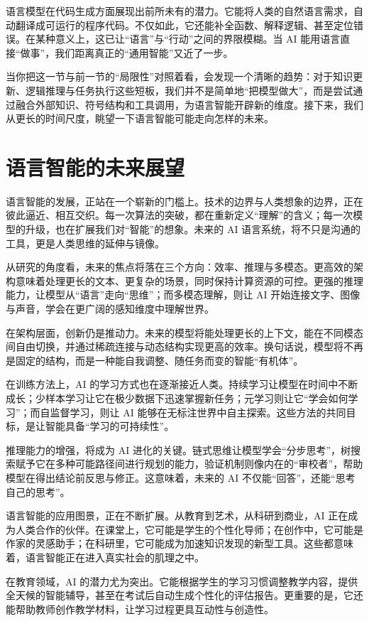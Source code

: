 语言模型在代码生成方面展现出前所未有的潜力。它能将人类的自然语言需求，自动翻译成可运行的程序代码。不仅如此，它还能补全函数、解释逻辑、甚至定位错误。在某种意义上，这已让“语言”与“行动”之间的界限模糊。当 AI 能用语言直接“做事”，我们距离真正的“通用智能”又近了一步。

当你把这一节与前一节的“局限性”对照着看，会发现一个清晰的趋势：对于知识更新、逻辑推理与任务执行这些短板，我们并不是简单地“把模型做大”，而是尝试通过融合外部知识、符号结构和工具调用，为语言智能开辟新的维度。接下来，我们从更长的时间尺度，眺望一下语言智能可能走向怎样的未来。

\section{语言智能的未来展望}

语言智能的发展，正站在一个崭新的门槛上。技术的边界与人类想象的边界，正在彼此逼近、相互交织。每一次算法的突破，都在重新定义“理解”的含义；每一次模型的升级，也在扩展我们对“智能”的想象。未来的 AI 语言系统，将不只是沟通的工具，更是人类思维的延伸与镜像。

从研究的角度看，未来的焦点将落在三个方向：效率、推理与多模态。更高效的架构意味着处理更长的文本、更复杂的场景，同时保持计算资源的可控。更强的推理能力，让模型从“语言”走向“思维”；而多模态理解，则让 AI 开始连接文字、图像与声音，学会在更广阔的感知维度中理解世界。

在架构层面，创新仍是推动力。未来的模型将能处理更长的上下文，能在不同模态间自由切换，并通过稀疏连接与动态结构实现更高的效率。换句话说，模型将不再是固定的结构，而是一种能自我调整、随任务而变的智能“有机体”。

在训练方法上，AI 的学习方式也在逐渐接近人类。持续学习让模型在时间中不断成长；少样本学习让它在极少数据下迅速掌握新任务；元学习则让它“学会如何学习”；而自监督学习，则让 AI 能够在无标注世界中自主探索。这些方法的共同目标，是让智能具备“学习的可持续性”。

推理能力的增强，将成为 AI 进化的关键。链式思维让模型学会“分步思考”，树搜索赋予它在多种可能路径间进行规划的能力，验证机制则像内在的“审校者”，帮助模型在得出结论前反思与修正。这意味着，未来的 AI 不仅能“回答”，还能“思考自己的思考”。

语言智能的应用图景，正在不断扩展。从教育到艺术，从科研到商业，AI 正在成为人类合作的伙伴。在课堂上，它可能是学生的个性化导师；在创作中，它可能是作家的灵感助手；在科研里，它可能成为加速知识发现的新型工具。这些都意味着，语言智能正在进入真实社会的肌理之中。

在教育领域，AI 的潜力尤为突出。它能根据学生的学习习惯调整教学内容，提供全天候的智能辅导，甚至在考试后自动生成个性化的评估报告。更重要的是，它还能帮助教师创作教学材料，让学习过程更具互动性与创造性。

